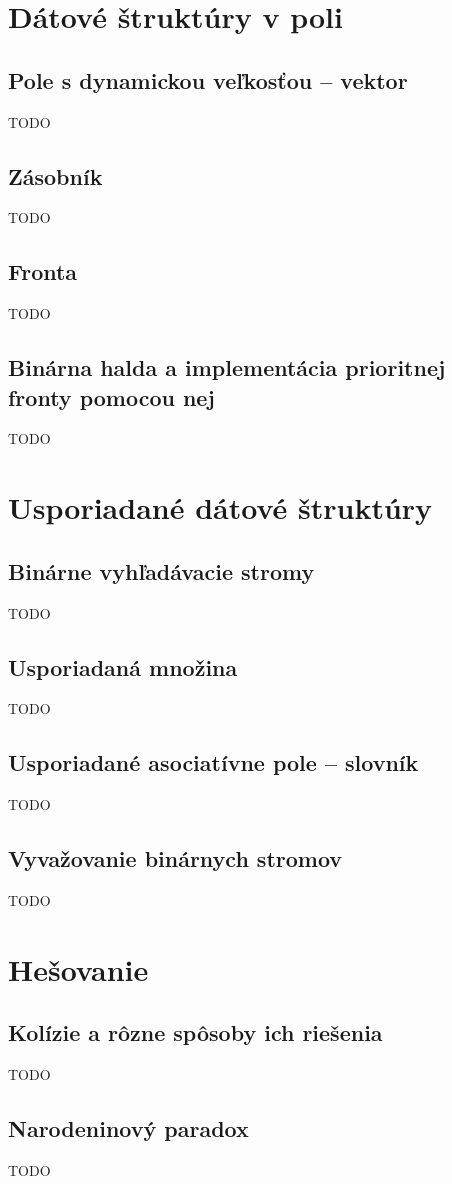 \section{Dátové štruktúry v poli}
	\subsection{Pole s dynamickou veľkosťou – vektor} TODO
	\subsection{Zásobník} TODO
	\subsection{Fronta} TODO
	\subsection{Binárna halda a implementácia prioritnej fronty pomocou nej} TODO

\section{Usporiadané dátové štruktúry}
	\subsection{Binárne vyhľadávacie stromy} TODO
	\subsection{Usporiadaná množina} TODO
	\subsection{Usporiadané asociatívne pole – slovník} TODO
	\subsection{Vyvažovanie binárnych stromov} TODO

\section{Hešovanie}

	\subsection{Kolízie a rôzne spôsoby ich riešenia} TODO
	\subsection{Narodeninový paradox} TODO
